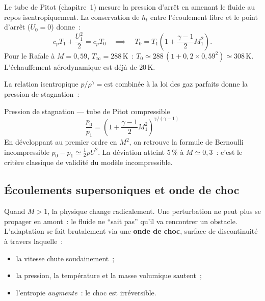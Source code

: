 \documentclass[11pt,a4paper]{report}
\begin{document}
Le tube de Pitot (chapitre~1) mesure la pression d'arr\^et en amenant le fluide au
repos isentropiquement. La conservation de $h_t$ entre l'\'ecoulement libre et le
point d'arr\^et ($U_0 = 0$) donne~:
\[
  c_p T_1 + \frac{U_1^2}{2} = c_p T_0
  \quad\implies\quad
  T_0 = T_1\!\left(1 + \frac{\gamma-1}{2}M_1^2\right).
\]
Pour le Rafale \`a $M = 0{,}59$, $T_\infty = 288\,\mathrm{K}$~:
$T_0 \simeq 288\,(1 + 0{,}2 \times 0{,}59^2) \simeq 308\,\mathrm{K}$. L'\'echauffement
a\'erodynamique est d\'ej\`a de $20\,\mathrm{K}$.

La relation isentropique $p/\rho^\gamma = \mathrm{cst}$ combin\'ee \`a la loi des gaz
parfaits donne la pression de stagnation~:

\begin{importantbox}{Pression de stagnation --- tube de Pitot compressible}
\[
  \frac{p_0}{p_1} = \left(1 + \frac{\gamma-1}{2}M_1^2\right)^{\!\gamma/(\gamma-1)}
\]
En d\'eveloppant au premier ordre en $M^2$, on retrouve la formule de Bernoulli
incompressible $p_0 - p_1 \simeq \tfrac{1}{2}\rho U^2$. La d\'eviation atteint 5\,\%
\`a $M \simeq 0{,}3$~: c'est le crit\`ere classique de validit\'e du mod\`ele incompressible.
\end{importantbox}

\subsection{\'Ecoulements supersoniques et onde de choc}

Quand $M > 1$, la physique change radicalement. Une perturbation ne peut plus se propager
en amont~: le fluide ne ``sait pas'' qu'il va rencontrer un obstacle. L'adaptation se fait
brutalement via une \textbf{onde de choc}, surface de discontinuit\'e \`a travers laquelle~:
\begin{itemize}
  \item la vitesse chute soudainement~;
  \item la pression, la temp\'erature et la masse volumique sautent~;
  \item l'entropie \emph{augmente}~: le choc est irr\'eversible.
\end{itemize}

\begin{center}
\end{center}
\end{document}
